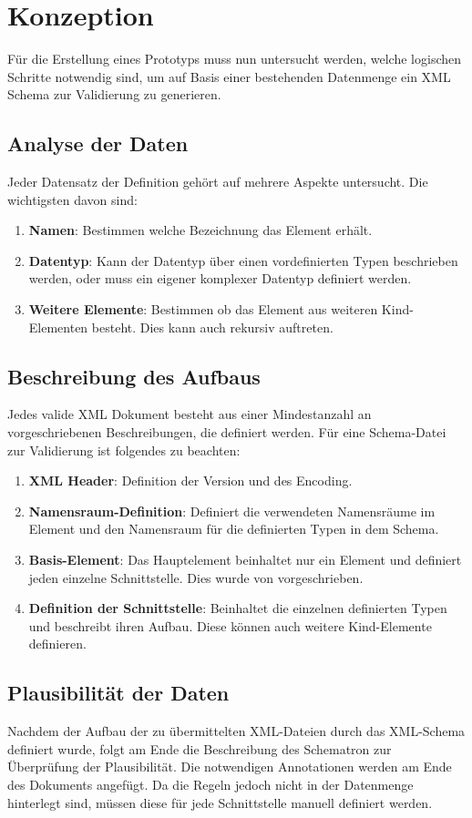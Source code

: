 \chapter{Konzeption}
\label{cha:Konzeption}
Für die Erstellung eines Prototyps muss nun untersucht werden, welche logischen Schritte notwendig sind, um auf Basis einer bestehenden Datenmenge ein XML Schema zur Validierung zu generieren. 

\section{Analyse der Daten}
Jeder Datensatz der Definition gehört auf mehrere Aspekte untersucht.
Die wichtigsten davon sind:

\begin{enumerate}
\item \textbf{Namen}: Bestimmen welche Bezeichnung das Element erhält.
\item \textbf{Datentyp}: Kann der Datentyp über einen vordefinierten Typen beschrieben werden, oder muss ein eigener komplexer Datentyp definiert werden. 
\item \textbf{Weitere Elemente}: Bestimmen ob das Element aus weiteren Kind-Elementen besteht. Dies kann auch rekursiv auftreten.
\end{enumerate}

\section{Beschreibung des Aufbaus}
Jedes valide XML Dokument besteht aus einer Mindestanzahl an vorgeschriebenen Beschreibungen, die definiert werden.
Für eine Schema-Datei zur Validierung ist folgendes zu beachten:

\begin{enumerate}
\item \textbf{XML Header}: Definition der Version und des Encoding.
\item \textbf{Namensraum-Definition}: Definiert die verwendeten Namensräume im Element und den Namensraum für die definierten Typen in dem Schema.
\item \textbf{Basis-Element}: Das Hauptelement beinhaltet nur ein Element und definiert jeden einzelne Schnittstelle. Dies wurde von \BMD vorgeschrieben.
\item \textbf{Definition der Schnittstelle}: Beinhaltet die einzelnen definierten Typen und beschreibt ihren Aufbau. Diese können auch weitere Kind-Elemente definieren.
\end{enumerate}

\section{Plausibilität der Daten}
Nachdem der Aufbau der zu übermittelten XML-Dateien durch das XML-Schema definiert wurde, folgt am Ende die Beschreibung des Schematron zur Überprüfung der Plausibilität.
Die notwendigen Annotationen werden am Ende des Dokuments angefügt. Da die Regeln jedoch nicht in der Datenmenge hinterlegt sind, müssen diese für jede Schnittstelle manuell definiert werden.
